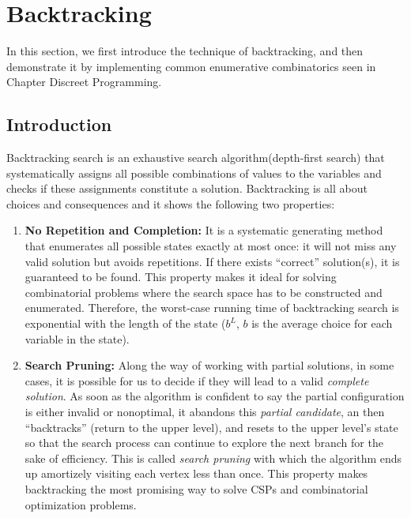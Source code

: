 \documentclass[../main.tex]{subfiles}
\begin{document}
\section{Backtracking}
In this section, we first introduce the technique of backtracking, and then demonstrate it by implementing common enumerative combinatorics seen in Chapter Discreet Programming. 
\subsection{Introduction}
Backtracking search is an exhaustive search algorithm(depth-first search) that systematically assigns all possible combinations of values to the variables and checks if these assignments constitute a solution. Backtracking is all about choices and consequences and it shows the following two properties:
 \begin{enumerate}
     \item \textbf{No Repetition and Completion:} It is a systematic generating method that enumerates all possible states exactly at most once: it will not miss any valid solution but  avoids repetitions. If there exists  ``correct'' solution(s), it is guaranteed to be found. This property makes it ideal for solving combinatorial problems where the search space has to be constructed  and enumerated. Therefore, the worst-case running time of backtracking search is exponential with the length of the state ($b^L$, $b$ is the average choice for each variable in the state).%
    \item \textbf{Search Pruning:} Along the way of working with partial solutions, in some cases, it is possible for us to decide if they will  lead to a valid \textit{complete solution}. As soon as the algorithm is confident to say the partial configuration is either invalid or nonoptimal,  it abandons this  \textit{partial candidate}, an then ``backtracks'' (return to the upper level), and resets to the upper level's state so that the search process can continue to explore the next branch for the sake of efficiency.  This is called \textit{search pruning} with which  the algorithm ends up amortizely visiting each vertex less than once.  This property makes backtracking the most promising way to solve CSPs and combinatorial optimization problems. 
 \end{enumerate}
\end{document}

